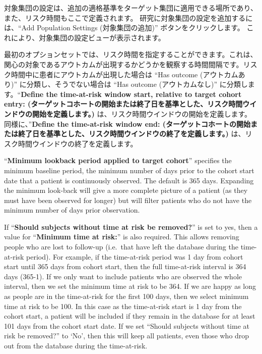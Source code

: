 \documentclass[
  11pt]{book}
\theoremstyle{definition}
\theoremstyle{definition}
\theoremstyle{definition}
\theoremstyle{definition}
\theoremstyle{remark}
\begin{document}
対象集団の設定は、追加の適格基準をターゲット集団に適用できる場所であり、また、リスク時間もここで定義されます。 研究に対象集団の設定を追加するには、``Add Population Settings (対象集団の追加)'' ボタンをクリックします。 これにより、対象集団の設定ビューが表示されます。

最初のオプションセットでは、リスク時間を指定することができます。これは、関心の対象であるアウトカムが出現するかどうかを観察する時間間隔です。リスク時間中に患者にアウトカムが出現した場合は ``Has outcome (アウトカムあり)'' に分類し、そうでない場合は ``Has outcome (アウトカムなし)'' に分類します。``\textbf{Define the time-at-risk window start, relative to target cohort entry: (ターゲットコホートの開始または終了日を基準とした、リスク時間ウインドウの開始を定義します。)} は、リスク時間ウインドウの開始を定義します。同様に、''\textbf{Define the time-at-risk window end: (ターゲットコホートの開始または終了日を基準とした、リスク時間ウインドウの終了を定義します。)} は、リスク時間ウインドウの終了を定義します。

``\textbf{Minimum lookback period applied to target cohort}'' specifies the minimum baseline period, the minimum number of days prior to the cohort start date that a patient is continuously observed. The default is 365 days. Expanding the minimum look-back will give a more complete picture of a patient (as they must have been observed for longer) but will filter patients who do not have the minimum number of days prior observation.

If ``\textbf{Should subjects without time at risk be removed?}'' is set to yes, then a value for ``\textbf{Minimum time at risk:}'' is also required. This allows removing people who are lost to follow-up (i.e.~that have left the database during the time-at-risk period). For example, if the time-at-risk period was 1 day from cohort start until 365 days from cohort start, then the full time-at-risk interval is 364 days (365-1). If we only want to include patients who are observed the whole interval, then we set the minimum time at risk to be 364. If we are happy as long as people are in the time-at-risk for the first 100 days, then we select minimum time at risk to be 100. In this case as the time-at-risk start is 1 day from the cohort start, a patient will be included if they remain in the database for at least 101 days from the cohort start date. If we set ``Should subjects without time at risk be removed?'' to `No', then this will keep all patients, even those who drop out from the database during the time-at-risk.
\end{document}
